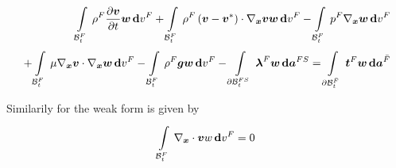 \begin{equation}
  \begin{split}
    \gint{\embedmanifold{B}^{F}_{t}}{}{\rho^{F}\delby{\vectr{v}}{t}\vect{w}}{v^{F}}
    +\gint{\embedmanifold{B}^{F}_{t}}{}{\rho^{F}\dotprod{\pbrac{\vectr{v}-\vect{v}^{*}}}{\gradient{\vectr{x}}{\vectr{v}}}\vect{w}}{v^{F}}
    -\gint{\embedmanifold{B}^{F}_{t}}{}{p^{F}\gradient{\vectr{x}}{\vect{w}}}{v^{F}}\\
    +\gint{\embedmanifold{B}^{F}_{t}}{}{\dotprod{\mu\gradient{\vectr{x}}{\vectr{v}}}{\gradient{\vectr{x}}{\vectr{w}}}}{v^{F}}
    -\gint{\embedmanifold{B}^{F}_{t}}{}{\rho^{F}\vect{g}\vect{w}}{v^{F}}
    -\gint{\boundary{\embedmanifold{B}}^{FS}_{t}}{}{\vectr{\lambda}^{F}\vectr{w}}{\covectr{a}^{FS}}
    =\gint{\boundary{\embedmanifold{B}}^{\bar{F}}_{t}}{}{\vectr{t}^{F}\vectr{w}}{\covectr{a}^{\bar{F}}}
  \end{split}
\end{equation}

Similarily for  the weak form is given by
\begin{equation}
  \gint{\embedmanifold{B}^{F}_{t}}{}{\divergence{\vectr{x}}{\vectr{v}}w}{v^{F}}=0
\end{equation}


